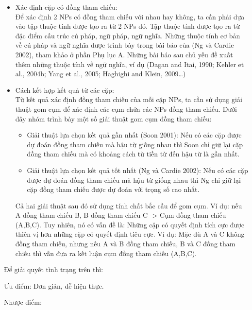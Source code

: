 \documentclass[12pt]{extarticle}
\begin{document}
				\begin{itemize}
					\item{Xác định cặp có đồng tham chiếu: 
						\\Để xác định 2 NPs có đồng tham chiếu với nhau hay không, ta cần phải dựa vào tập thuộc tính được tạo ra từ 2 NPs đó. Tập thuộc tính được tạo ra từ đặc điểm cấu trúc cú pháp, ngữ pháp, ngữ nghĩa. Những thuộc tính cơ bản về cú pháp và ngữ nghĩa được trình bày trong bài báo của (Ng và Cardie 2002), tham khảo ở phần Phụ lục A. Những bài báo sau chủ yếu đề xuất thêm những thuộc tính về ngữ nghĩa, ví dụ (Dagan and Itai, 1990; Kehler et al., 2004b; Yang et al., 2005; Haghighi and Klein, 2009…)}
					\item{Cách kết hợp kết quả từ các cặp: 
						\\Từ kết quả xác định đồng tham chiếu của mỗi cặp NPs, ta cần sử dụng giải thuật gom cụm để xác định các cụm chứa các NPs đồng tham chiếu. Dưới đây nhóm trình bày một số giải thuật gom cụm đồng tham chiếu:
						\begin{itemize}
							\item{Giải thuật lựa chọn kết quả gần nhất (Soon 2001): Nếu có các cặp được dự đoán đồng tham chiếu mà hậu từ giống nhau thì Soon chỉ giữ lại cặp đồng tham chiếu mà có khoảng cách từ tiền từ đến hậu từ là gần nhất.}
							\item{Giải thuật lựa chọn kết quả tốt nhất (Ng và Cardie 2002): Nếu có các cặp được dự đoán đồng tham chiếu mà hậu từ giống nhau thì Ng chỉ giữ lại cặp đồng tham chiếu được dự đoán với trọng số cao nhất.}
						\end{itemize}}
						\par Cả hai giải thuật sau đó sử dụng  tính chất bắc cầu để gom cụm. Ví dụ: nếu A đồng tham chiếu B, B đồng tham chiếu C -> Cụm đồng tham chiếu (A,B,C). Tuy nhiên, nó có vấn đề là: Những cặp có quyết định tích cực được thiên vị hơn những cặp có quyết định tiêu cực. Ví dụ: Mặc dù A và C không đồng tham chiếu, nhưng nếu A và B đồng tham chiếu, B và C đồng tham chiếu thì vẫn đưa ra kết luận cụm đồng tham chiếu (A,B,C).
				\end{itemize}			 
				\par Để giải quyết tình trạng trên thì:
				\par Ưu điểm: Đơn giản, dễ hiện thực.
				\par Nhược điểm:
\end{document}
